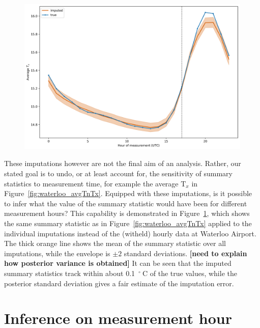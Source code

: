 \documentclass[letter]{article}
\makeatletter
\def\maxwidth{\ifdim\Gin@nat@width>\linewidth\linewidth
\else\Gin@nat@width\fi}
\let\Oldincludegraphics\includegraphics
\renewcommand{\includegraphics}[1]{\Oldincludegraphics[width=0.98\maxwidth]{#1}}
\newcommand{\T}{\mathrm{T}}
\newcommand{\Tx}{\T_{x}}
\newcommand{\degreeC}{{}^{\circ}~\mathrm{C}}
\makeatother
\begin{document}
        \begin{figure}
\centering
\includegraphics{../figures/imputed_summary_stats.png}
\caption{\label{fig:imputed_summary_stats}}
\end{figure}
    


        These imputations however are not the final aim of an analysis.
Rather, our stated goal is to undo, or at least account for, the sensitivity of summary statistics to measurement time, for example the average \(\Tx\) in Figure~\ref{fig:waterloo_avgTnTx}.
Equipped with these imputations, is it possible to infer what the value of the summary statistic would have been for different measurement hours?
This capability is demonstrated in Figure~\ref{fig:imputed_summary_stats},
which shows the same summary statistic as in Figure~\ref{fig:waterloo_avgTnTx} applied to the individual imputations instead of the (witheld) hourly data at Waterloo Airport.
The thick orange line shows the mean of the summary statistic over all imputations, while the envelope is \(\pm 2\) standard deviations.
\textbf{{[}need to explain how posterior variance is obtained{]}}
It can be seen that the imputed summary statistics track within about 0.1~\(\degreeC\) of the true values,
while the posterior standard deviation gives a fair estimate of the imputation error.
    


        \section{Inference on measurement hour}\label{inference-on-measurement-hour}
\end{document}

